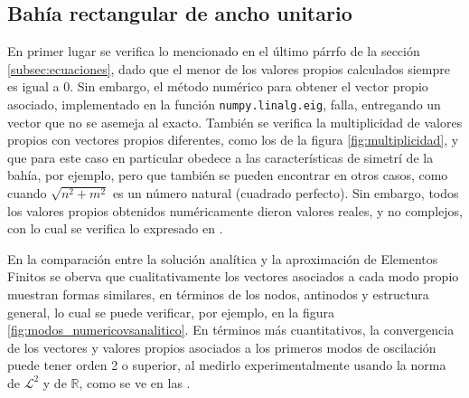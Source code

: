 \subsection{Bah\'ia rectangular de ancho unitario} 
  
  En primer lugar se verifica lo mencionado en el \'ultimo p\'arrfo de la secci\'on \ref{subsec:ecuaciones}, dado que el menor de los valores propios calculados siempre es igual a 0. Sin embargo, el m\'etodo num\'erico para obtener el vector propio asociado, implementado en la funci\'on \verb;numpy.linalg.eig;, falla, entregando un vector que no se asemeja al exacto. Tambi\'en se verifica la multiplicidad de valores propios con vectores propios diferentes, como los de la figura \ref{fig:multiplicidad}, y que para este caso en particular obedece a las caracter\'isticas de simetr\'i de la bah\'ia, por ejemplo, pero que tambi\'en se pueden encontrar en otros casos, como cuando $\sqrt{n^2+m^2}$ es un n\'umero natural (cuadrado perfecto). Sin embargo, todos los valores propios obtenidos num\'ericamente dieron valores reales, y no complejos, con lo cual se verifica lo expresado en \cite{nica2011}.
  
  En la comparaci\'on entre la soluci\'on anal\'itica y la aproximaci\'on de Elementos Finitos se oberva que cualitativamente los vectores asociados a cada modo propio muestran formas similares, en t\'erminos de los nodos, antinodos y estructura general, lo cual se puede verificar, por ejemplo, en la figura \ref{fig:modos_numericovsanalitico}. En t\'erminos m\'as cuantitativos, la convergencia de los vectores y valores propios asociados a los primeros modos de oscilaci\'on puede tener orden 2 o superior, al medirlo experimentalmente usando la norma de $\mathcal{L}^2$ y de $\mathbb{R}$, como se ve en las .